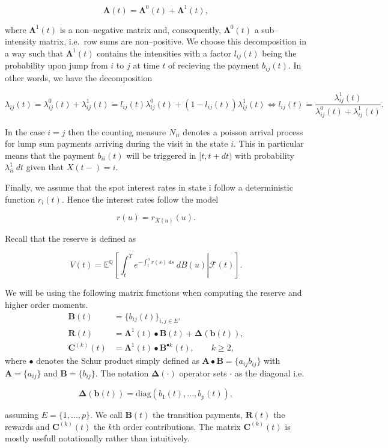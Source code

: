 \documentclass[a4paper,10pt,openany]{book}
\begin{document}
\[
\mathbf \Lambda(t)=\mathbf \Lambda^0(t) + \mathbf \Lambda^1(t),
\]

where \(\mathbf \Lambda^1(t)\) is a non--negative matrix and, consequently, \(\mathbf \Lambda^0(t)\) a sub--intensity matrix, i.e.~row sums are non--positive. We choose this decomposition in a way such that \(\mathbf \Lambda^1(t)\) contains the intensities with a factor \(l_{ij}(t)\) being the probability upon jump from \(i\) to \(j\) at time \(t\) of recieving the payment \(b_{ij}(t)\). In other words, we have the decomposition

\[
\lambda_{ij}(t)=\lambda_{ij}^0(t)+\lambda_{ij}^1(t)=l_{ij}(t)\lambda_{ij}^0(t)+(1-l_{ij}(t))\lambda_{ij}^1(t)\iff l_{ij}(t)=\frac{\lambda_{ij}^1(t)}{\lambda_{ij}^0(t)+\lambda_{ij}^1(t)}.
\]

In the case \(i=j\) then the counting measure \(N_{ii}\) denotes a poisson arrival process for lump sum payments arriving during the visit in the state \(i\). This in particular means that the payment \(b_{ii}(t)\) will be triggered in \([t,t+dt)\) with probability \(\lambda_{ii}^1\ dt\) given that \(X(t-)=i\).

Finally, we assume that the spot interest rates in state i follow a deterministic function \(r_i(t)\). Hence the interest rates follow the model

\[
r(u) = r_{X(u)}(u).
\]

Recall that the reserve is defined as

\[
V(t)=\mathbb E^{\mathbb Q}\left[\left.\int_t^Te^{-\int_t^ur(s)\ ds}\ dB(u)\right\vert \mathcal F(t)\right].
\]

We will be using the following matrix functions when computing the reserve and higher order moments.
\begin{align*}
\mathbf B(t)&=\{b_{ij}(t)\}_{i,j\in E},\\
\mathbf R(t)&=\mathbf \Lambda^1(t)\bullet \mathbf B(t) + \mathbf \Delta (\mathbf b(t)),\\
\mathbf C^{(k)}(t)&=\mathbf \Lambda^1(t)\bullet \mathbf B^{\bullet k}(t),\qquad k\ge 2,
\end{align*}
where \(\bullet\) denotes the Schur product simply defined as \(\mathbf A\bullet\mathbf B=\{a_{ij}b_{ij}\}\) with \(\mathbf A=\{a_{ij}\}\) and \(\mathbf B=\{b_{ij}\}\). The notation \(\mathbf \Delta (\cdot)\) operator sets \(\cdot\) as the diagonal i.e.

\[
\mathbf \Delta (\mathbf b(t))=\text{diag}(b_1(t),...,b_p(t)),
\]

assuming \(E=\{1,...,p\}\). We call \(\mathbf B(t)\) the transition payments, \(\mathbf R(t)\) the rewards and \(\mathbf C^{(k)}(t)\) the \(k\)th order contributions. The matrix \(\mathbf C^{(k)}(t)\) is mostly usefull notationally rather than intuitively.
\end{document}
